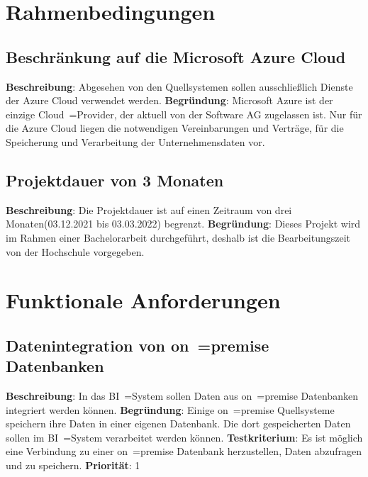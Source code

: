 \section{Rahmenbedingungen} 

\subsection{Beschränkung auf die Microsoft Azure Cloud} \label{sec:anforderungsspezifikation:azureCloud}
\textbf{Beschreibung}: Abgesehen von den Quellsystemen sollen ausschließlich Dienste der Azure Cloud verwendet werden.
\newline\textbf{Begründung}: Microsoft Azure ist der einzige Cloud~=Provider, der aktuell von der Software AG zugelassen ist. Nur für die Azure Cloud liegen die notwendigen Vereinbarungen und Verträge, für die Speicherung und Verarbeitung der Unternehmensdaten vor.

\subsection{Projektdauer von 3 Monaten} \label{sec:anforderungsspezifikation:projektDauer}
\textbf{Beschreibung}: Die Projektdauer ist auf einen Zeitraum von drei Monaten(03.12.2021 bis 03.03.2022) begrenzt.
\newline \textbf{Begründung}: Dieses Projekt wird im Rahmen einer Bachelorarbeit durchgeführt, deshalb ist die Bearbeitungszeit von der Hochschule vorgegeben.

\section{Funktionale Anforderungen} \label{sec:anforderungsspezifikation:funktionaleAnforderungen}

\subsection{Datenintegration von on~=premise Datenbanken} \label{sec:anforderungsspezifikation:datenintegrationOnPremDB}
\textbf{Beschreibung}: In das BI~=System sollen Daten aus on~=premise Datenbanken integriert werden können.
\newline \textbf{Begründung}: Einige on~=premise Quellsysteme speichern ihre Daten in einer eigenen Datenbank. Die dort gespeicherten Daten sollen im BI~=System verarbeitet werden können.
\newline \textbf{Testkriterium}: Es ist möglich eine Verbindung zu einer on~=premise Datenbank herzustellen, Daten abzufragen und zu speichern.
\newline \textbf{Priorität}: 1


